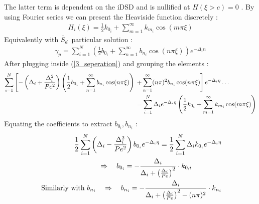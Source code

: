 \documentclass[12pt]{article}
\numberwithin{equation}{section}
\begin{document}
\begin{flushleft}
The latter term is dependent on the iDSD and is nullified at $H(\xi>c)=0$ . By using Fourier series we can present the Heaviside function discretely :
\begin{align} 
H_{i}(\xi)=\frac{1}{2} k_{0_{i}}+\sum_{m=1}^{\infty} k_{m_{i}} \cos (m \pi \xi) \label{3_heaviside_d}
\end{align} 
Equivalently with $\bar{S}_{d}$\, particular solution :
\begin{align} 
\gamma_{p}=\sum_{i=1}^{N}\left(\frac{1}{2} b_{0_{i}}+\sum_{n=1}^{\infty} b_{n_{i}} \cos (n \pi \xi)\right) e^{-\Delta_{i} n}
\end{align} 
After plugging inside (\ref{3_seperation}) and grouping the elements :
\begin{align} 
\sum_{i=1}^{N}\left[-\left(\Delta_{i}+\frac{\Delta_{i}^{2}}{P e^{2}}\right)\left(\frac{1}{2} b_{0_{i}}+\sum_{n=1}^{\infty} b_{n_{i}} \cos (n \pi \xi)\right)\right.&\left.+\sum_{n=1}^{\infty}(n \pi)^{2} b_{n_{i}} \cos (n \pi \xi)\right] e^{-\Delta_{i} \eta} \ldots \\
&=\sum_{i=1}^{N} \Delta_{i} e^{-\Delta_{i} \eta}\left(\frac{1}{2} k_{0_{i}}+\sum_{m=1}^{\infty} k_{m_{i}} \cos (m \pi \xi)\right) \notag
\end{align} 
Equating the coefficients to extract $b_{0_{i}}, b_{n_{i}}$ : 
\begin{align} 
\qquad \frac{1}{2} \sum_{i=1}^{N}\left(\Delta_{i}-\frac{\Delta_{i}^{2}}{P e^{2}}\right) b_{0_{i}} e^{-\Delta_{i} \eta}=\frac{1}{2} \sum_{i=1}^{N} \Delta_{i} k_{0_{i}} e^{-\Delta_{i} \eta} \\
\Rightarrow  \quad b_{0_{i}}=-\frac{\Delta_{i}}{\Delta_{i}+\left(\frac{\Delta_{i}}{P e}\right)^{2}} \cdot k_{0, i} \hspace{15mm}  \label{3_K_0i} \\
\text { Similarly with } b_{n_{i}} \quad \Rightarrow \quad b_{n_{i}}=-\frac{\Delta_{i}}{\Delta_{i}+\left(\frac{\Delta_{i}}{P e}\right)^{2}-(n \pi)^{2}} \cdot k_{n_{i}} \label{3_K_ni}
\end{align} 


\end{flushleft}
\end{document}
